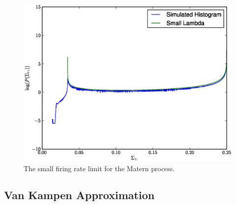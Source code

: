 \begin{figure}
\label{fig:matern_histograms}
\includegraphics[width=\columnwidth]{figures/matern_histogram.eps}
\caption{The small firing rate limit for the Matern process.}
\end{figure}

\subsection{Van Kampen Approximation}

